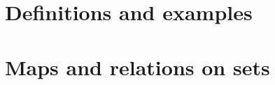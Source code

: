 

\newcommand{\get}[1]{\section{#1}}



\get{Definitions and examples}
\get{Maps and relations on sets}


